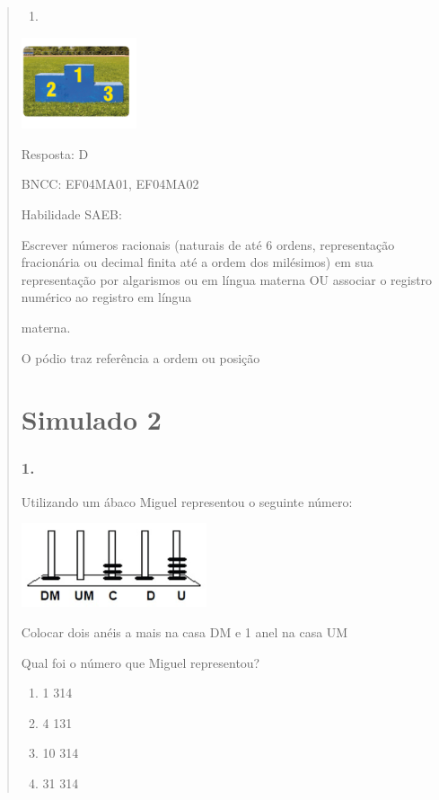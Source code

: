 \begin{enumerate}
\begin{escolha}
\begin{enumerate}
\begin{itemize}
\begin{itemize}
\begin{escolha}
\begin{quote}
\begin{escolha}
{\begin{enumerate}
\def\labelenumi{\alph{enumi})}
\item
\end{enumerate}

\includegraphics[width=1.33345in,height=1.05843in]{media/image151.png}

Resposta: D

BNCC: EF04MA01, EF04MA02

Habilidade SAEB:

Escrever números racionais (naturais de até 6 ordens, representação
fracionária ou decimal finita até a ordem dos milésimos) em sua
representação por algarismos ou em língua materna OU associar o registro
numérico ao registro em língua

materna.

O pódio traz referência a ordem ou posição

\section{Simulado 2}\label{simulado-2}

\subsubsection{1.}\label{section-157}

Utilizando um ábaco Miguel representou o seguinte número:

\includegraphics[width=2.14744in,height=0.97003in]{media/image152.png}

Colocar dois anéis a mais na casa DM e 1 anel na casa UM

Qual foi o número que Miguel representou?

\begin{enumerate}
\def\labelenumi{\alph{enumi})}
\item
  1 314
\item
  4 131
\item
  10 314
\item
  31 314
\end{enumerate}

}
\end{escolha}
\end{quote}
\end{escolha}
\end{itemize}
\end{itemize}
\end{enumerate}
\end{escolha}
\end{enumerate}
